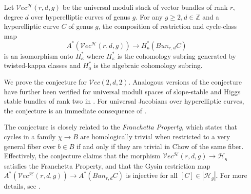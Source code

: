 \documentclass[11pt]{amsart}
\newcommand\Z{\mathbb{Z}}
\newenvironment{conj}[1]
  {\renewcommand\theinnercustomconj{#1}\innercustomconj}
  {\endinnercustomthm}
\numberwithin{theorem}{section}
\numberwithin{lemma}{section}
\theoremstyle{definition}
\newcommand{\ri}{\rightarrow}
\newcommand{\h}{\mathcal{H}}
\newcommand{\ve}{\mathcal{V}ec}
\newcommand{\ka}{\kappa}
\begin{document}
\begin{conj}{A}\label{conj:main}
	Let $\ve^\h({r,d,g})$ be the universal moduli stack of vector bundles of rank $r$, degree $d$ over hyperelliptic curves of genus $g$.
For any $g\geq 2, d\in\Z$ and a hyperelliptic curve $C$ of genus $g$, the composition of restriction and cycle-class map 
	$$A^*(\ve^\h({r,d,g}))\ri H_{a}^*(Bun_{r,d}C)$$ is an isomorphism onto $H^*_{\ka}$ where $H^*_{\ka}$ is the cohomology subring generated by twisted-kappa classes and $H^*_a$ is the algebraic cohomology subring.
\end{conj}

We prove the conjecture for $\ve(2,d,2)$. 
Analogous versions of the conjecture have further been verified for universal moduli spaces of slope-stable and Higgs stable bundles of rank two in \cite{shubham-higgs}.
For universal Jacobians over hyperelliptic curves, the conjecture is an immediate consequence of \cite[Theorem 1.1]{larson-24}.

The conjecture is closely related to the \textit{Franchetta Property}, which states that cycles in a family $\chi \ri B$ are homologically trivial when restricted to a very general fiber over $b\in B$ if and only if they are trivial in Chow of the same fiber. 
Effectively, the conjecture claims that the morphism $\ve^\h(r,d,g)\ri \h_g$ satisfies the Franchetta Property, 
and that the Gysin restriction map $A^*(\ve^\h(r,d,g))\ri A^*(Bun_{r,d}C)$ is injective for all $[C]\in |\h_g|$.
For more details, see \cite{laterveer-franchetta}. 
\end{document}
